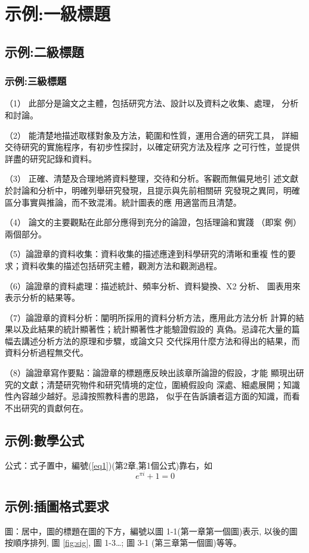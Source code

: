 \section{示例:一級標題}
\subsection{示例:二級標題}
\subsubsection{示例:三級標題}
（1） 此部分是論文之主體，包括研究方法、設計以及資料之收集、處理，
分析和討論。

（2） 能清楚地描述取樣對象及方法，範圍和性質，運用合適的研究工具，
詳細交待研究的實施程序，有初步性探討，以確定研究方法及程序
之可行性，並提供詳盡的研究記錄和資料。

（3） 正確、清楚及合理地將資料整理，交待和分析。客觀而無偏見地引
述文獻於討論和分析中，明確列舉研究發現，且提示與先前相關研
究發現之異同，明確區分事實與推論，而不致混淆。統計圖表的應
用適當而且清楚。

（4） 論文的主要觀點在此部分應得到充分的論證，包括理論和實踐 （即案
例）兩個部分。

（5）論證章的資料收集：資料收集的描述應達到科學研究的清晰和重複
性的要求；資料收集的描述包括研究主體，觀測方法和觀測過程。

（6）論證章的資料處理：描述統計、頻率分析、資料變換、X2 分析、
圖表用來表示分析的結果等。

（7）論證章的資料分析：闡明所採用的資料分析方法，應用此方法分析
計算的結果以及此結果的統計顯著性；統計顯著性才能驗證假設的
真偽。忌諱花大量的篇幅去講述分析方法的原理和步驟，或論文只
交代採用什麼方法和得出的結果，而資料分析過程無交代。

（8）論證章寫作要點：論證章的標題應反映出該章所論證的假設，才能
顯現出研究的文獻；清楚研究物件和研究情境的定位，圍繞假設向
深處、細處展開；知識性內容越少越好。忌諱按照教科書的思路，
似乎在告訴讀者這方面的知識，而看不出研究的貢獻何在。

\subsection{示例:數學公式}
公式：式子置中，編號(\ref{eq1})(第2章,第1個公式)靠右，如
\begin{equation}
\label{eq1}
	e^{\pi i}+1=0
\end{equation}


\subsection{示例:插圖格式要求}
圖：居中，圖的標題在圖的下方，編號以圖 1-1(第一章第一個圖)表示,
以後的圖按順序排列, 圖 \ref{fig:sig}, 圖 1-3…; 圖 3-1 (第三章第一個圖)等等。
